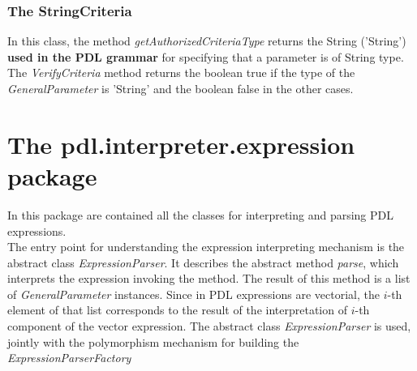 \documentclass[a4paper,11pt] {ivoa}
\begin{document}
\subsubsection{The StringCriteria}
In this class, the method {\it getAuthorizedCriteriaType} returns the String ('String') {\bf used in the PDL grammar} for specifying that a parameter is of String type.\\
The {\it VerifyCriteria} method returns the boolean true if the type of the {\it GeneralParameter} is 'String' and the boolean false in the other cases.

\section{The pdl.interpreter.expression package}
In this package are contained all the classes for interpreting and parsing PDL expressions.\\
The entry point for understanding the expression interpreting mechanism is the abstract class {\it ExpressionParser}. 
It describes the abstract method {\it parse}, which interprets the expression invoking the method. The result of this method is a list of {\it GeneralParameter} instances. Since in PDL expressions are vectorial, the $i$-th element of that list corresponds to the result of the interpretation of $i$-th component of the vector expression.
The abstract class {\it ExpressionParser} is used, jointly with the polymorphism mechanism for building the {\it ExpressionParserFactory}
\end{document}
